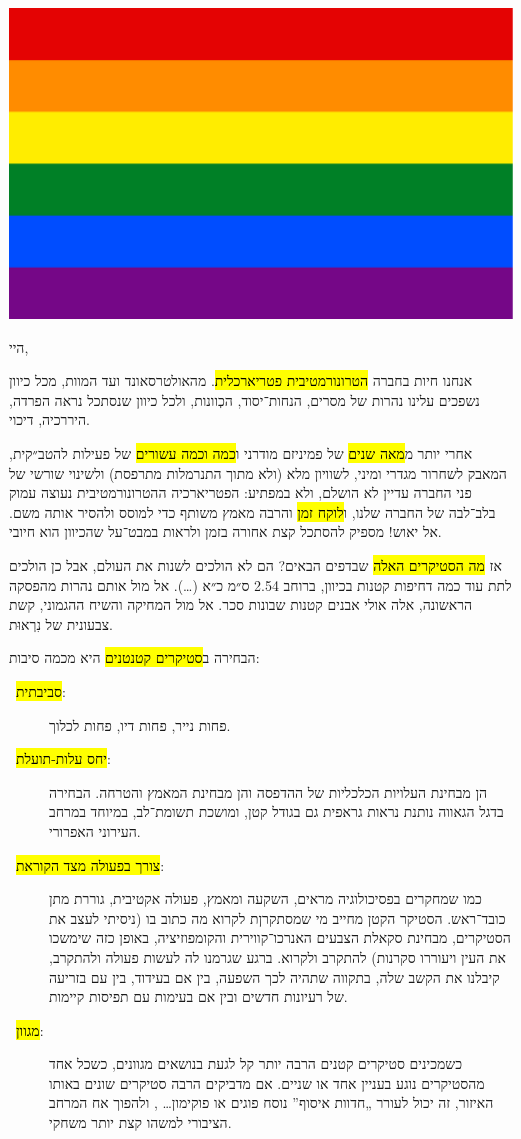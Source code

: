 \color{magenta!75!white}
\setRL{}
\includegraphics[width=\textwidth, height=1ex]{flag.eps}

\vspace{0.5cm}

{
\setlength{\parindent}{0cm}
\setlength{\parskip}{0.5cm}

היי,

אנחנו חיות בחברה \hl{הטרונורמטיבית פטריארכלית}. מהאולטרסאונד ועד המוות, מכל כיוון נשפכים עלינו נהרות של מסרים, הנחות־יסוד, הכְוונות, ולכל כיוון שנסתכל נראה הפרדה, היררכיה, דיכוי.

אחרי יותר מ\hl{מאה שנים} של פמיניזם מודרני ו\hl{כמה וכמה עשורים} של פעילות להטב״קית, המאבק לשחרור מגדרי ומיני, לשוויון מלא (ולא מתוך התנרמלות מתרפסת) ולשינוי שורשי של פני החברה עדיין לא הושלם, ולא במפתיע: הפטריארכיה ההטרונורמטיבית נעוצה עמוק בלב־לבה של החברה שלנו, ו\hl{לוקח זמן} והרבה מאמץ משותף כדי למוסס ולהסיר אותה משם. אל יאוש! מספיק להסתכל קצת אחורה בזמן ולראות במבט־על שהכיוון הוא חיובי.

אז \hl{מה הסטיקרים האלה} שבדפים הבאים? הם לא הולכים לשנות את העולם, אבל כן הולכים לתת עוד כמה דחיפות קטנות בכיוון, ברוחב 2.54 ס״מ כ״א (…). אל מול אותם נהרות מהפסקה הראשונה, אלה אולי אבנים קטנות שבונות סכר. אל מול המחיקה והשיח ההגמוני, קשת צבעונית של נִרְאוּת.

\flagline

\newcommand{\descitem}[2]{\item[\symbolglyph{◃}~#1\hspace{1em}]#2}
הבחירה ב\hl{סטיקרים קטנטנים} היא מכמה סיבות:
\begin{description}
	\descitem{\hl{סביבתית}:}{פחות נייר, פחות דיו, פחות לכלוך.}
	\descitem{\hl{יחס עלות-תועלת}:}{הן מבחינת העלויות הכלכליות של ההדפסה והן מבחינת המאמץ והטרחה. הבחירה בדגל הגאווה נותנת נראות גראפית גם בגודל קטן, ומושכת תשומת־לב, במיוחד במרחב העירוני האפרורי.}
	\descitem{\hl{צורך בפעולה מצד הקוראת}:}{כמו שמחקרים בפסיכולוגיה מראים, השקעה ומאמץ, פעולה אקטיבית, גוררת מתן כובד־ראש. הסטיקר הקטן מחייב מי שמסתקרןת לקרוא מה כתוב בו (ניסיתי לעצב את הסטיקרים, מבחינת סקאלת הצבעים האנרכו־קווירית והקומפוזיציה, באופן כזה שימשכו את העין ויעוררו סקרנות) להתקרב ולקרוא. ברגע שגרמנו לה לעשות פעולה ולהתקרב, קיבלנו את הקשב שלה, בתקווה שתהיה לכך השפעה, בין אם בעידוד, בין עם בזריעה של רעיונות חדשים ובין אם בעימות עם תפיסות קיימות.}
	\descitem{\hl{מגוון}:}{כשמכינים סטיקרים קטנים הרבה יותר קל לגעת בנושאים מגוונים, כשכל אחד מהסטיקרים נוגע בעניין אחד או שניים. אם מדביקים הרבה סטיקרים שונים באותו האיזור, זה יכול לעורר „חדוות איסוף” נוסח פוגים או פוקימון… \symbolglyph{☺}, ולהפוך אח המרחב הציבורי למשהו קצת יותר משחקי.

}
\end{description}}
